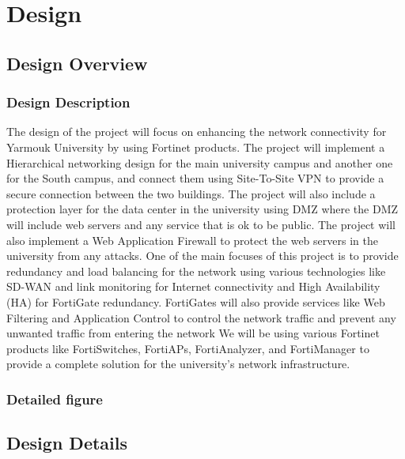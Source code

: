 \documentclass[12pt]{report}
\begin{document}

\chapter{Design}

\section{Design Overview}
\subsection{Design Description}
The design of the project will focus on enhancing the network connectivity for Yarmouk University by using Fortinet products. The project will implement a Hierarchical networking design for the main university campus and another one for the South campus, and connect them using Site-To-Site VPN to provide a secure connection between the two buildings. The project will also include a protection layer for the data center in the university using DMZ where the DMZ will include web servers and any service that is ok to be public. The project will also implement a Web Application Firewall to protect the web servers in the university from any attacks. One of the main focuses of this project is to provide redundancy and load balancing for the network using various technologies like SD-WAN and link monitoring for Internet connectivity and High Availability (HA) for FortiGate redundancy. FortiGates will also provide services like Web Filtering and Application Control to control the network traffic and prevent any unwanted traffic from entering the network We will be using various Fortinet products like FortiSwitches, FortiAPs, FortiAnalyzer, and FortiManager to provide a complete solution for the university's network infrastructure.

\subsection{Detailed figure}

\section{Design Details}
\end{document}
